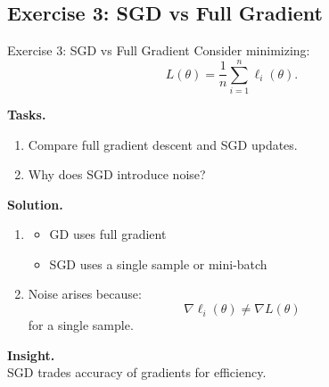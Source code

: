 \documentclass[aspectratio=169,11pt]{beamer}
\begin{document}
\subsection{Exercise 3: SGD vs Full Gradient}
\begin{frame}[t,allowframebreaks]{Exercise 3: SGD vs Full Gradient}
\small
Consider minimizing:
\[
L(\theta) = \frac{1}{n} \sum_{i=1}^n \ell_i(\theta).
\]

\textbf{Tasks.}\\ \begin{enumerate}
    \item Compare full gradient descent and SGD updates.
    \item Why does SGD introduce noise?
\end{enumerate}

\textbf{Solution.}\\ \begin{enumerate}
\item 
\begin{itemize}
    \item GD uses full gradient
    \item SGD uses a single sample or mini-batch
\end{itemize}

\item Noise arises because:
\[
\nabla \ell_i(\theta) \neq \nabla L(\theta)
\]
for a single sample.
\end{enumerate}

\textbf{Insight.}\\ SGD trades accuracy of gradients for efficiency.
\end{frame}
\end{document}
